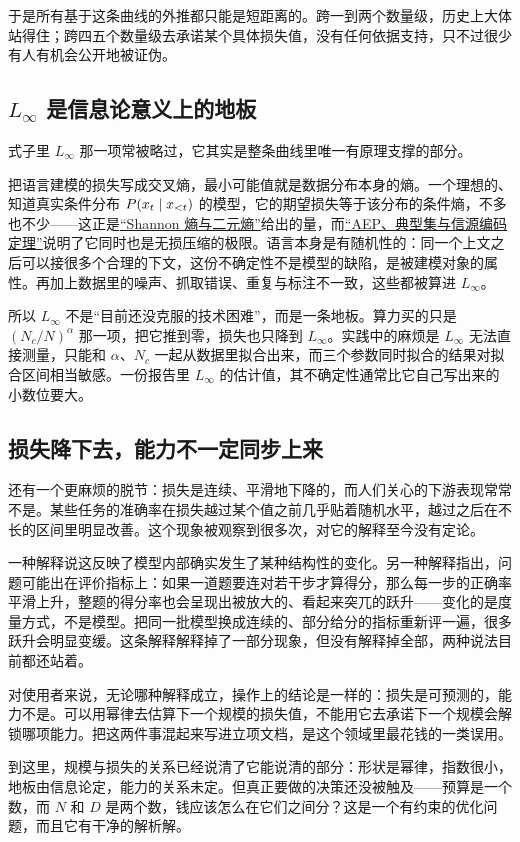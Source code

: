 于是所有基于这条曲线的外推都只能是短距离的。跨一到两个数量级，历史上大体站得住；跨四五个数量级去承诺某个具体损失值，没有任何依据支持，只不过很少有人有机会公开地被证伪。

\subsection{\texorpdfstring{\(L_\infty\) 是信息论意义上的地板}{极限项是信息论意义上的地板}}

式子里 \(L_\infty\) 那一项常被略过，它其实是整条曲线里唯一有原理支撑的部分。

把语言建模的损失写成交叉熵，最小可能值就是数据分布本身的熵。一个理想的、知道真实条件分布 \(P(x_t \mid x_{<t})\) 的模型，它的期望损失等于该分布的条件熵，不多也不少——这正是\hyperref[sec:07-Information-Theory/01-Information-and-Entropy/02]{``Shannon 熵与二元熵''}给出的量，而\hyperref[sec:07-Information-Theory/04-Source-Coding/04]{``AEP、典型集与信源编码定理''}说明了它同时也是无损压缩的极限。语言本身是有随机性的：同一个上文之后可以接很多个合理的下文，这份不确定性不是模型的缺陷，是被建模对象的属性。再加上数据里的噪声、抓取错误、重复与标注不一致，这些都被算进 \(L_\infty\)。

所以 \(L_\infty\) 不是``目前还没克服的技术困难''，而是一条地板。算力买的只是 \((N_c/N)^{\alpha}\) 那一项，把它推到零，损失也只降到 \(L_\infty\)。实践中的麻烦是 \(L_\infty\) 无法直接测量，只能和 \(\alpha\)、\(N_c\) 一起从数据里拟合出来，而三个参数同时拟合的结果对拟合区间相当敏感。一份报告里 \(L_\infty\) 的估计值，其不确定性通常比它自己写出来的小数位要大。

\subsection{损失降下去，能力不一定同步上来}

还有一个更麻烦的脱节：损失是连续、平滑地下降的，而人们关心的下游表现常常不是。某些任务的准确率在损失越过某个值之前几乎贴着随机水平，越过之后在不长的区间里明显改善。这个现象被观察到很多次，对它的解释至今没有定论。

一种解释说这反映了模型内部确实发生了某种结构性的变化。另一种解释指出，问题可能出在评价指标上：如果一道题要连对若干步才算得分，那么每一步的正确率平滑上升，整题的得分率也会呈现出被放大的、看起来突兀的跃升——变化的是度量方式，不是模型。把同一批模型换成连续的、部分给分的指标重新评一遍，很多跃升会明显变缓。这条解释解释掉了一部分现象，但没有解释掉全部，两种说法目前都还站着。

对使用者来说，无论哪种解释成立，操作上的结论是一样的：损失是可预测的，能力不是。可以用幂律去估算下一个规模的损失值，不能用它去承诺下一个规模会解锁哪项能力。把这两件事混起来写进立项文档，是这个领域里最花钱的一类误用。

\medskip

到这里，规模与损失的关系已经说清了它能说清的部分：形状是幂律，指数很小，地板由信息论定，能力的关系未定。但真正要做的决策还没被触及——预算是一个数，而 \(N\) 和 \(D\) 是两个数，钱应该怎么在它们之间分？这是一个有约束的优化问题，而且它有干净的解析解。
